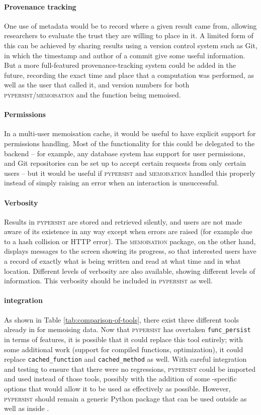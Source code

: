 \documentclass{deliverablereport}
\newcommand{\pypersist}{\textsc{pypersist}}
\newcommand{\Memoisation}{\textsc{memoisation}}
\begin{document}
\paragraph{Provenance tracking}
One use of metadata would be to record where a given result came from, allowing
researchers to evaluate the trust they are willing to place in it.  A limited
form of this can be achieved by sharing results using a version control system
such as Git, in which the timestamp and author of a commit give some useful
information.  But a more full-featured provenance-tracking system could be added
in the future, recording the exact time and place that a computation was
performed, as well as the user that called it, and version numbers for both
\pypersist{}/\Memoisation{} and the function being memoised.

\paragraph{Permissions}
In a multi-user memoisation cache, it would be useful to have explicit support
for permissions handling.  Most of the functionality for this could be delegated
to the backend -- for example, any database system has support for user
permissions, and Git repositories can be set up to accept certain requests from
only certain users -- but it would be useful if \pypersist{} and \Memoisation{} handled this
properly instead of simply raising an error when an interaction is unsuccessful.

\paragraph{Verbosity}
Results in \pypersist{} are stored and retrieved silently, and users are not
made aware of its existence in any way except when errors are raised (for
example due to a hash collision or HTTP error).  The \Memoisation{} package, on the other hand,
displays messages to the screen showing its progress, so that
interested users have a record of exactly what is being written and read at what
time and in what location.  Different levels of verbosity are also available, showing different
levels of information.  This verbosity should be included in \pypersist{} as well.

\paragraph{\Sage integration}
As shown in Table \ref{tab:comparison-of-tools}, there exist three different
tools already in \Sage for memoising data.  Now that \pypersist{} has overtaken
\texttt{func\_persist} in terms of features, it is possible that it could replace this tool
entirely; with some additional work (support for compiled functions,
optimization), it could replace \texttt{cached\_function} and
\texttt{cached\_method} as well.
With careful integration and testing to ensure that there were no
regressions, \pypersist{} could be imported and used instead of those tools,
possibly with the addition of some \Sage-specific options that would allow it to
be used as effectively as possible.  However, \pypersist{} should remain a
generic Python package that can be used outside as well as inside \Sage.
\end{document}
